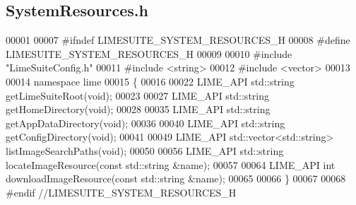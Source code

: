 \subsection{System\+Resources.\+h}
\label{SystemResources_8h_source}

\begin{DoxyCode}
00001 
00007 \textcolor{preprocessor}{#ifndef LIMESUITE\_SYSTEM\_RESOURCES\_H}
00008 \textcolor{preprocessor}{#define LIMESUITE\_SYSTEM\_RESOURCES\_H}
00009 
00010 \textcolor{preprocessor}{#include "LimeSuiteConfig.h"}
00011 \textcolor{preprocessor}{#include <string>}
00012 \textcolor{preprocessor}{#include <vector>}
00013 
00014 \textcolor{keyword}{namespace }lime
00015 \{
00016 
00022 LIME_API std::string getLimeSuiteRoot(\textcolor{keywordtype}{void});
00023 
00027 LIME_API std::string getHomeDirectory(\textcolor{keywordtype}{void});
00028 
00035 LIME_API std::string getAppDataDirectory(\textcolor{keywordtype}{void});
00036 
00040 LIME_API std::string getConfigDirectory(\textcolor{keywordtype}{void});
00041 
00049 LIME_API std::vector<std::string> listImageSearchPaths(\textcolor{keywordtype}{void});
00050 
00056 LIME_API std::string locateImageResource(\textcolor{keyword}{const} std::string &name);
00057 
00064 LIME_API \textcolor{keywordtype}{int} downloadImageResource(\textcolor{keyword}{const} std::string &name);
00065 
00066 \}
00067 
00068 \textcolor{preprocessor}{#endif //LIMESUITE\_SYSTEM\_RESOURCES\_H}
\end{DoxyCode}
